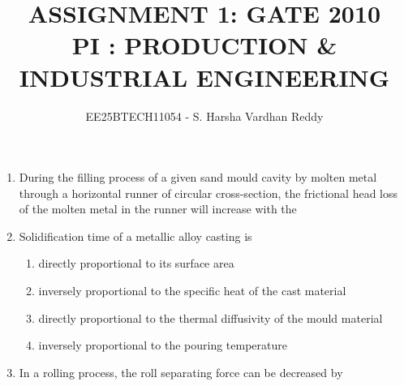 \documentclass[journal,12pt,onecolumn]{IEEEtran}
\theoremstyle{remark}
\begin{document}
\title{
ASSIGNMENT 1: GATE 2010 \\
PI : PRODUCTION \& INDUSTRIAL ENGINEERING}
\author{EE25BTECH11054 - S. Harsha Vardhan Reddy}
\maketitle
\renewcommand{\thefigure}{\theenumi}
\renewcommand{\thetable}{\theenumi}
\begin{enumerate}

\item During the filling process of a given sand mould cavity by molten metal through a horizontal runner of circular cross-section, the frictional head loss of the molten metal in the runner will increase with the
\hfill{}
\begin{enumerate}
\end{enumerate}

\item Solidification time of a metallic alloy casting is
\hfill{}
\begin{enumerate}
\item directly proportional to its surface area
\item inversely proportional to the specific heat of the cast material
\item directly proportional to the thermal diffusivity of the mould material
\item inversely proportional to the pouring temperature
\end{enumerate}

\item In a rolling process, the roll separating force can be decreased by
\hfill{}
\begin{enumerate}
\end{enumerate}


\end{enumerate}
\end{document}
